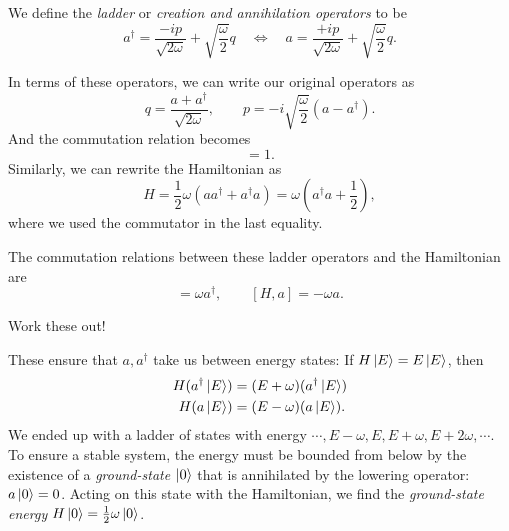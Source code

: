 \begin{definition}[]
  We define the \emph{ladder} or \emph{creation and annihilation operators} to be
  \begin{equation}
    a^\dagger = \frac{-i p}{\sqrt{2 \omega}} + \sqrt{\frac{\omega}{2}} q \quad \iff \quad a = \frac{+ip}{\sqrt{2\omega}} + \sqrt{\frac{\omega}{2}}q.
  \end{equation}
\end{definition}

In terms of these operators, we can write our original operators as
\begin{equation}
  q = \frac{a + a^\dagger}{\sqrt{2 \omega}}, \qquad p = -i \sqrt{\frac{\omega}{2}} (a - a^\dagger).
\end{equation}
And the commutation relation becomes 
\begin{equation}
  [a, a^\dagger] = 1.
\end{equation}
Similarly, we can rewrite the Hamiltonian as
\begin{equation}
  H = \frac{1}{2} \omega (a a^\dagger + a^\dagger a) = \omega(a^\dagger a + \frac{1}{2}),
\end{equation}
where we used the commutator in the last equality.

The commutation relations between these ladder operators and the Hamiltonian are
\begin{equation}
  [H, a^\dagger] = \omega a^\dagger, \qquad [H, a] = -\omega a.
\end{equation} 
\begin{exercise}
Work these out!
\end{exercise}
These ensure that $a, a^\dagger$ take us between energy states:
If $H \ket{E} = E \ket{E}$, then
\begin{align}
  H(a^\dagger \ket{E}) &= (E + \omega) (a^\dagger \ket{E}) \\
  H(a \ket{ E}) &=(E - \omega) (a \ket{E}).
\end{align}
We ended up with a ladder of states with energy $\cdots, E-\omega, E, E + \omega, E + 2 \omega, \cdots$.
To ensure a stable system, the energy must be bounded from below by the existence of a \emph{ground-state} $\ket{0}$ that is annihilated by the lowering operator: $a \ket{0} = 0$.
Acting on this state with the Hamiltonian, we find the \emph{ground-state energy} $H \ket{0} = \frac{1}{2} \omega \ket{0}$.

